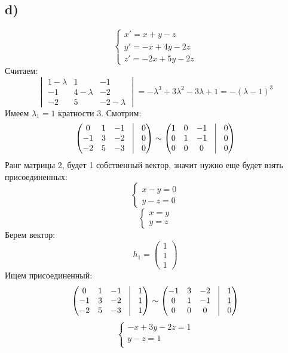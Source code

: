 \documentclass[a4paper,12pt]{article}
\begin{document}
\subsection*{d)}
\[
\begin{cases}
x' = x + y - z \\
y' = -x + 4y - 2z \\
z' = -2x + 5y -2z
\end{cases}
\]
Считаем:
\[
\begin{vmatrix}
1 - \lambda& 1 & -1 \\
-1 & 4  - \lambda& -2 \\
-2 &5 & -2  - \lambda 
\end{vmatrix} = -\lambda^3 + 3 \lambda^2 -3 \lambda + 1 = -(\lambda - 1)^3
\]
Имеем $\lambda_1 = 1$ кратности 3. Смотрим:
\[
\begin{pmatrix}
0& 1 & -1 & \vrule & 0 \\
-1 & 3& -2 & \vrule & 0\\
-2 &5 & -3  & \vrule & 0 
\end{pmatrix}  \sim 
\begin{pmatrix}
1& 0& -1 & \vrule & 0 \\
0 & 1& -1 & \vrule & 0\\
0 &0& 0  & \vrule & 0 
\end{pmatrix} 
\]
Ранг матрицы 2, будет 1 собственный вектор, значит нужно еще будет взять присоединенных:
\[
\begin{cases}
x - y = 0 \\
y - z = 0 
\end{cases}
\]
\[
\begin{cases}
x = y \\
y = z
\end{cases}
\]
Берем вектор:
\[
h_1 = \begin{pmatrix}
1 \\ 1 \\ 1
\end{pmatrix}
\]
Ищем присоединенный:
\[
\begin{pmatrix}
0& 1 & -1 & \vrule & 1 \\
-1 & 3& -2 & \vrule & 1\\
-2 &5 & -3  & \vrule & 1
\end{pmatrix}  \sim 
\begin{pmatrix}
-1& 3 & -2 & \vrule & 1 \\
0 & 1& -1 & \vrule & 1\\
0 & 0 & 0& \vrule & 0
\end{pmatrix}  
\]
\[
\begin{cases}
-x + 3y - 2z = 1 \\
y - z = 1 \\
\end{cases}
\]
\end{document}
